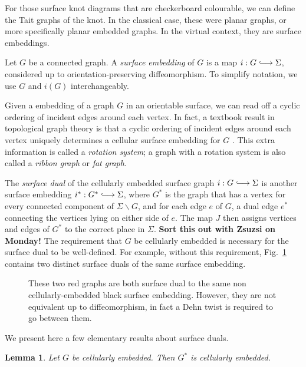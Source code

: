 \documentclass[12pt]{report}
\newcommand{\inject}{\lhook\joinrel\longrightarrow}
\newcommand{\notered}[1]{{\color{Red} \textbf{#1}}}
\newtheorem*{lemma}{Lemma}
\theoremstyle{upright}
\begin{document}
For those surface knot diagrams that are checkerboard colourable, we can define the Tait graphs of the knot. In the classical case, these were planar graphs, or more specifically planar embedded graphs. In the virtual context, they are surface embeddings.

Let $G$ be a connected graph. A \textit{surface embedding} of $G$ is a map $i: G \inject \Sigma$, considered up to orientation-preserving diffeomorphism. To simplify notation, we use $G$ and $i(G)$ interchangeably.

Given a embedding of a graph $G$ in an orientable surface, we can read off a cyclic ordering of incident edges around each vertex. In fact, a textbook result in topological graph theory is that a cyclic ordering of incident edges around each vertex uniquely determines a cellular surface embedding for $G$ \cite[Theorem 3.2.4]{graphs-on-surfaces}. This extra information is called a \textit{rotation system}; a graph with a rotation system is also called a \textit{ribbon graph} or \textit{fat graph}.

The \textit{surface dual} of the cellularly embedded surface graph $i: G \inject \Sigma$ is another surface embedding $i^{*}: G^{*} \inject \Sigma$, where $G^{*}$ is the graph that has a vertex for every connected component of  $\Sigma \smallsetminus G$, and for each edge $e$ of $G$, a dual edge $e^{\ast}$ connecting the vertices lying on either side of $e$. The map $J$ then assigns vertices and edges of $G^{*}$ to the correct place in $\Sigma$. \notered{Sort this out with Zsuzsi on Monday!} The requirement that $G$ be cellularly embedded is necessary for the surface dual to be well-defined. For example, without this requirement, Fig.~\ref{fig:multiple_dual_graphs} contains two distinct surface duals of the same surface embedding.

\begin{figure}[hbt!]
	\centering
	\def\svgscale{0.45}
	
	
	\caption{These two red graphs are both surface dual to the same non cellularly-embedded black surface embedding. However, they are not equivalent up to diffeomorphism, in fact a Dehn twist is required to go between them.}
	\label{fig:multiple_dual_graphs}
\end{figure}


We present here a few elementary results about surface duals.

\begin{lemma}
Let $G$ be cellularly embedded. Then $G^{*}$ is cellularly embedded.
\end{lemma}
\end{document}
